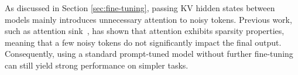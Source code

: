 
As discussed in Section \ref{sec:fine-tuning}, passing KV hidden states between models mainly introduces  unnecessary attention to noisy tokens. Previous work, such as attention sink~\cite{xiao2023efficient}, has shown that attention exhibits sparsity properties, meaning that a few noisy tokens do not significantly impact the final output. Consequently, using a standard prompt-tuned model without further fine-tuning can still yield strong performance on simpler tasks.


